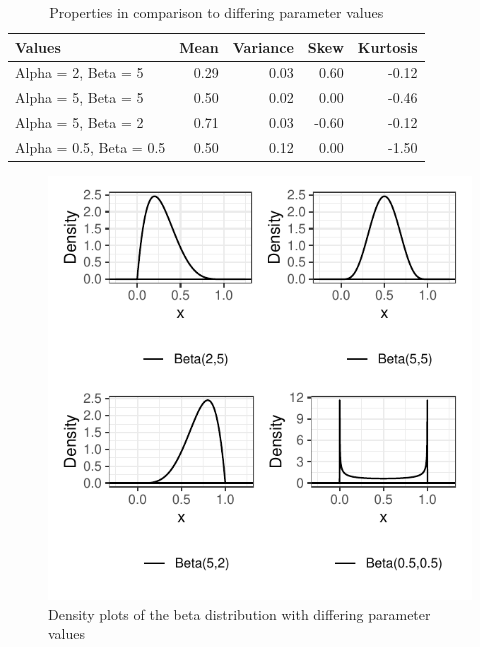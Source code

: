 \documentclass{article}\usepackage[]{graphicx}\usepackage[]{xcolor}
\begin{document}
\begin{multicols}{2}
\begin{table}[H]
\centering
\begingroup\small
\begin{tabular}{lrrrr}
  \hline
Values & Mean & Variance & Skew & Kurtosis \\ 
  \hline
Alpha = 2, Beta = 5 & 0.29 & 0.03 & 0.60 & -0.12 \\ 
  Alpha = 5, Beta = 5 & 0.50 & 0.02 & 0.00 & -0.46 \\ 
  Alpha = 5, Beta = 2 & 0.71 & 0.03 & -0.60 & -0.12 \\ 
  Alpha = 0.5, Beta = 0.5 & 0.50 & 0.12 & 0.00 & -1.50 \\ 
   \hline
\end{tabular}
\endgroup
\caption{Properties in comparison to differing parameter values} 
\label{distrib.tab}
\end{table}



\begin{figure}[H]
 \begin{center}
 \includegraphics[scale=0.75]{parameter_comparison.pdf}
 \caption{Density plots of the beta distribution with differing parameter values}
 \label{fig1}
 \end{center}
 \end{figure}





\end{multicols}
\end{document}
